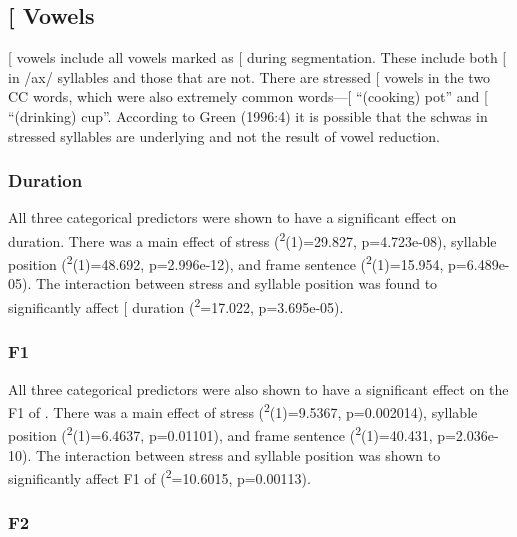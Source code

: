 \documentclass[floatsintext,man]{apa6}
\theoremstyle{definition}
\theoremstyle{definition}
\theoremstyle{definition}
\theoremstyle{remark}
\begin{document}
\subsection{\texorpdfstring{{[}\textipa{@}{]}
Vowels}{{[}{]} Vowels}}\label{vowels}

{[}\textipa{@}{]} vowels include all vowels marked as {[}\textipa{@}{]}
during segmentation. These include both {[}\textipa{@}{]} in /ax/
syllables and those that are not. There are stressed {[}\textipa{@}{]}
vowels in the two CC words, which were also
extremely common words---{[}\textipa{"p@t@}{]} \enquote{(cooking) pot}
and {[}\textipa{"k@p@}{]} \enquote{(drinking) cup}. According to Green
(1996:4) it is possible that the schwas in stressed syllables are
underlying and not the result of vowel reduction.

\subsubsection{Duration}\label{duration-1}

All three categorical predictors were shown to have a significant effect
on  duration. There was a main effect of stress
(\textsuperscript{2}(1)=29.827, p=4.723e-08), syllable
position (\textsuperscript{2}(1)=48.692, p=2.996e-12), and
frame sentence (\textsuperscript{2}(1)=15.954, p=6.489e-05).
The interaction between stress and syllable position was found to
significantly affect {[}\textipa{@}{]} duration
(\textsuperscript{2}=17.022, p=3.695e-05).

\subsubsection{F1}\label{f1-1}

All three categorical predictors were also shown to have a significant
effect on the F1 of . There was a main effect of stress
(\textsuperscript{2}(1)=9.5367, p=0.002014), syllable
position (\textsuperscript{2}(1)=6.4637, p=0.01101), and
frame sentence (\textsuperscript{2}(1)=40.431, p=2.036e-10).
The interaction between stress and syllable position was shown to
significantly affect F1 of 
(\textsuperscript{2}=10.6015, p=0.00113).

\subsubsection{F2}\label{f2-1}
\end{document}
